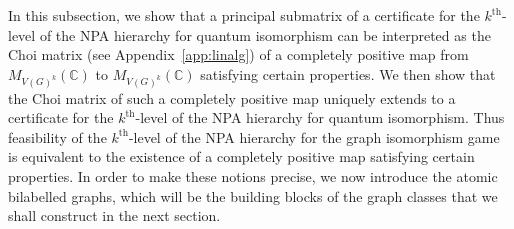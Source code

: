 \documentclass[a4paper,onecolumn,11pt,accepted=2026-01-06]{quantumarticle}
\theoremstyle{plain}
\theoremstyle{remark}
\theoremstyle{definition}
\newtheorem{definition}[thm]{Definition}
\DeclareMathOperator{\rel}{rel}
\newcommand{\cyclicpermutations}{\mathscr{C}(1,\dots, k, 2k, \dots, k+1)}
\begin{document}
In this subsection, we show that a principal submatrix of a certificate for the $k^{\text{th}}$-level of the NPA hierarchy for quantum isomorphism can be interpreted as the Choi matrix (see Appendix~\ref{app:linalg}) of a completely positive map from $M_{V(G)^k}(\mathbb{C})$ to $M_{V(G)^k}(\mathbb{C})$ satisfying certain properties. We then show that the Choi matrix of such a completely positive map uniquely extends to a certificate for the $k^{\text{th}}$-level of the NPA hierarchy for quantum isomorphism. Thus feasibility of the $k^{\text{th}}$-level of the NPA hierarchy for the graph isomorphism game is equivalent to the existence of a completely positive map satisfying certain properties. In order to make these notions precise, we now introduce the atomic bilabelled graphs, which will be the building blocks of the graph classes that we shall construct in the next section. 



\end{document}
